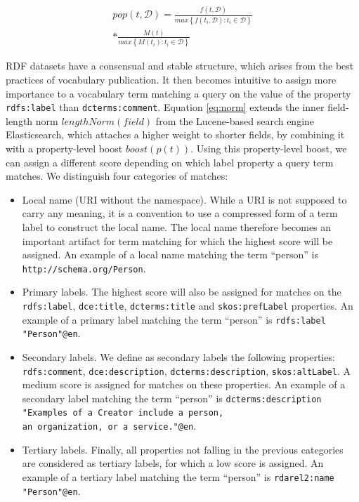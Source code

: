 \documentclass{iosart2c}
\begin{document}
\begin{equation}\label{eq:pop}
\begin{split}
pop(t,\mathcal{D}) = \frac{f(t,\mathcal{D})}{max\left\{f(t_i,\mathcal{D}): t_i \in \mathcal{D}\right\}} \\
* \frac{M(t)}{max\left\{M(t_i): t_i \in \mathcal{D}\right\}}
\end{split}
\end{equation}

RDF datasets have a consensual and stable  structure, which arises from the best practices of vocabulary publication. It then becomes intuitive to assign more importance to a vocabulary term matching a query on the value of the property {\small\texttt{rdfs:label}} than {\small\texttt{dcterms:comment}}. Equation \ref{eq:norm} extends the inner field-length norm $lengthNorm(field)$ from the Lucene-based search engine Elasticsearch, which attaches a higher weight to shorter fields, by combining it with a property-level boost $boost(p(t))$. Using this property-level boost, we can assign a different score depending on which label property a query term matches. We distinguish four categories of matches: 
		\begin{itemize}
 			\item Local name (URI without the namespace). While a URI is not supposed to carry any meaning, it is a convention to use a compressed form of a term label to construct the local name. The local name therefore becomes an important artifact for term matching for which the highest score will be assigned. An example of a local name matching the term ``person'' is {\small\texttt{http://schema.org/Person}}.
			\item Primary labels. The highest score will also be assigned for matches on the {\small\texttt{rdfs:label}}, {\small\texttt{dce:title}}, {\small\texttt{dcterms:title}} and {\small\texttt{skos:prefLabel}} properties. An example of a primary label matching the term ``person'' is {\small\texttt{rdfs:label "Person"@en}}.
			\item Secondary labels. We define as secondary labels the following properties: {\small\texttt{rdfs:comment}}, {\small\texttt{dce:description}}, {\small\texttt{dcterms:description}}, {\small\texttt{skos:altLabel}}. A medium score is assigned for matches on these properties. An example of a secondary label matching the term ``person'' is {\small\texttt{dcterms:description}} {\small\texttt{"Examples of a Creator include a person,\\ an organization, or a service."@en}}.
			\item Tertiary labels. Finally, all properties not falling in the previous categories are considered as tertiary labels, for which a low score is assigned. An example of a tertiary label matching the term ``person'' is {\small\texttt{rdarel2:name "Person"@en}}. 
		\end{itemize}
\end{document}
